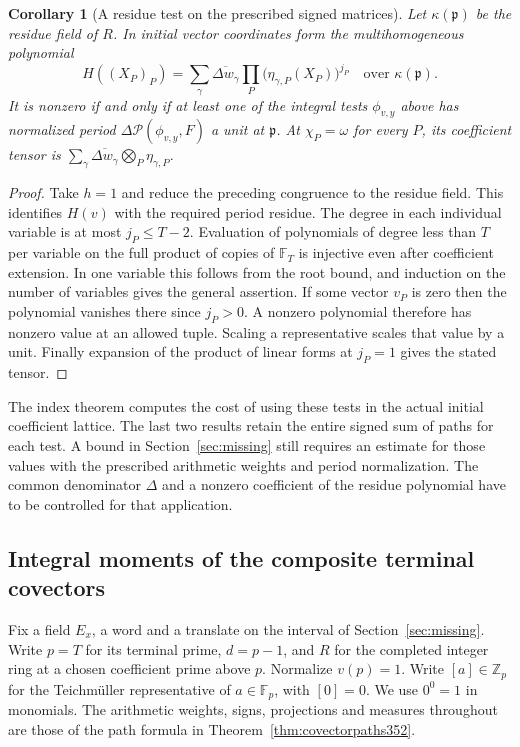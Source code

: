 \documentclass[a4paper,11pt]{article}
\newtheorem{corollary}[proposition]{Corollary}
\theoremstyle{definition}
\theoremstyle{remark}
\newcommand{\ZZ}{\mathbb Z}\newcommand{\ord}{\operatorname{ord}}
\numberwithin{equation}{section}
\begin{document}
\begin{corollary}[A residue test on the prescribed signed matrices]
\label{cor:initialresidue396}
Let \(\kappa(\mathfrak p)\) be the residue field of \(R\).
In initial vector coordinates form the multihomogeneous polynomial
\[
     H((X_P)_P)=
       \sum_\gamma\overline{\Delta w_\gamma}
                     \prod_P\big(\eta_{\gamma,P}(X_P)\big)^{j_P}
                  \quad\text{over }\kappa(\mathfrak p).
\]
It is nonzero if and only if at least one of the integral tests
\(\phi_{v,y}\) above has normalized period
\(\Delta\mathcal P(\phi_{v,y},F)\) a unit at \(\mathfrak p\).
At \(\chi_P=\omega\) for every \(P\), its coefficient tensor is
\(\sum_\gamma\overline{\Delta w_\gamma}\bigotimes_P
\eta_{\gamma,P}\).
\end{corollary}
\begin{proof}
Take \(h=1\) and reduce the preceding congruence to the residue
field. This identifies \(H(v)\) with the required period residue.
The degree in each individual variable is at most
\(j_P\le T-2\). Evaluation of polynomials of degree less than
\(T\) per variable on the full product of copies of \(\mathbb F_T\)
is injective even after coefficient extension. In one variable
this follows from the root bound, and induction on the number
of variables gives the general assertion. If some vector
\(v_P\) is zero then the polynomial vanishes there since
\(j_P>0\). A nonzero polynomial therefore has nonzero value
at an allowed tuple. Scaling a representative scales that
value by a unit. Finally expansion of the product of linear
forms at \(j_P=1\) gives the stated tensor.
\end{proof}

The index theorem computes the cost of using these tests in the
actual initial coefficient lattice. The last two results retain
the entire signed sum of paths for each test. A bound in
Section~\ref{sec:missing} still requires an estimate for those
values with the prescribed arithmetic weights and period
normalization. The common denominator \(\Delta\) and a nonzero
coefficient of the residue polynomial have to be controlled
for that application.


\subsection{Integral moments of the composite terminal covectors}
\label{sec:teichmoments400}

Fix a field \(E_x\), a word and a translate on the interval of
Section~\ref{sec:missing}. Write \(p=T\) for its terminal prime,
\(d=p-1\), and \(R\) for the completed integer ring at a chosen
coefficient prime above \(p\). Normalize \(v(p)=1\). Write
\([a]\in\ZZ_p\) for the Teichm\"uller representative of
\(a\in\mathbb F_p\), with \([0]=0\). We use \(0^0=1\) in monomials.
The arithmetic weights, signs, projections and measures throughout
are those of the path formula in Theorem~\ref{thm:covectorpaths352}.
\end{document}
